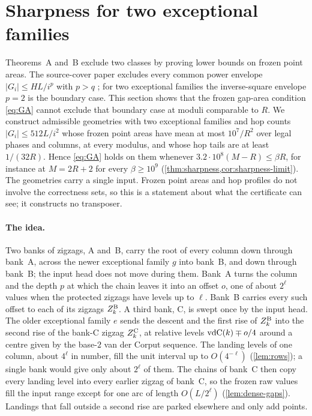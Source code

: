 \section{Sharpness for two exceptional families}\label{sec:sharpness}

Theorems~A and~B exclude two classes by proving lower bounds on frozen point areas. The
source-cover paper excludes every common power envelope $|G_i|\le HL/i^p$ with $p>q$
\cite[Corollary~4.4]{SourceCovers2026}; for two exceptional families the inverse-square
envelope $p=2$ is the boundary case. This section shows that the frozen gap-area condition
\eqref{eq:GA} cannot exclude that boundary case at moduli comparable to $R$. We construct
admissible geometries with two exceptional families and hop counts $|G_i|\le512L/i^2$
whose frozen point areas have mean at most $10^7/R^2$ over legal phases and columns, at
every modulus, and whose hop tails are at least $1/(32R)$. Hence \eqref{eq:GA} holds on
them whenever $3.2\cdot10^8(M-R)\le\beta R$, for instance at $M=2R+2$ for every
$\beta\ge10^9$ (\cref{thm:sharpness,cor:sharpness-limit}). The geometries carry a single
input. Frozen point areas and hop profiles do not involve the correctness sets, so this is
a statement about what the certificate can see; it constructs no transposer.

\paragraph{The idea.}
Two banks of zigzags, A and~B, carry the root of every column down through bank~A,
across the newer exceptional family $g$ into bank~B, and down through bank~B; the input
head does not move during them. Bank~A turns the column and the depth $p$ at which the
chain leaves it into an offset $o$, one of about $2^\ell$ values when the protected
zigzags have levels up to $\ell$. Bank~B carries every such offset to each of its
zigzags $Z^{\mathrm B}_k$. A third bank, C, is swept once by the input head. The older exceptional
family $e$ sends the descent and the first rise of $Z^{\mathrm B}_k$ into the second rise of the
bank-C zigzag $Z^{\mathrm C}_k$, at relative levels $\mathrm{vdC}(k)\mp o/4$ around a centre given by the
base-$2$ van der Corput sequence. The landing levels of one column, about $4^\ell$ in
number, fill the unit interval up to $O(4^{-\ell})$ (\cref{lem:rows}); a single bank
would give only about $2^\ell$ of them. The chains of bank~C then copy every landing
level into every earlier zigzag of bank~C, so the frozen raw values fill the input range
except for one arc of length $O(L/2^\ell)$ (\cref{lem:dense-gaps}). Landings that fall
outside a second rise are parked elsewhere and only add points.

